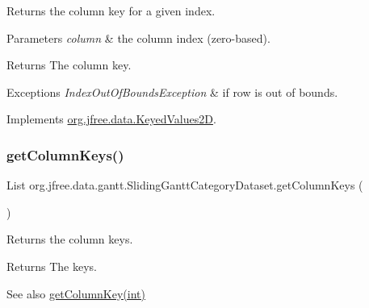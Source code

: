 Returns the column key for a given index.


\begin{DoxyParams}{Parameters}
{\em column} & the column index (zero-\/based).\\
\hline
\end{DoxyParams}
\begin{DoxyReturn}{Returns}
The column key.
\end{DoxyReturn}

\begin{DoxyExceptions}{Exceptions}
{\em Index\+Out\+Of\+Bounds\+Exception} & if {\ttfamily row} is out of bounds. \\
\hline
\end{DoxyExceptions}


Implements \mbox{\hyperlink{interfaceorg_1_1jfree_1_1data_1_1_keyed_values2_d_a9ced6cbaf04f048db059e1ebf5184d2a}{org.\+jfree.\+data.\+Keyed\+Values2D}}.

\mbox{\label{classorg_1_1jfree_1_1data_1_1gantt_1_1_sliding_gantt_category_dataset_a5a6d9404ac2413409fe2c046a8c758df}} 
\subsubsection{\texorpdfstring{get\+Column\+Keys()}{getColumnKeys()}}
{\footnotesize\ttfamily List org.\+jfree.\+data.\+gantt.\+Sliding\+Gantt\+Category\+Dataset.\+get\+Column\+Keys (\begin{DoxyParamCaption}{ }\end{DoxyParamCaption})}

Returns the column keys.

\begin{DoxyReturn}{Returns}
The keys.
\end{DoxyReturn}
\begin{DoxySeeAlso}{See also}
\mbox{\hyperlink{classorg_1_1jfree_1_1data_1_1gantt_1_1_sliding_gantt_category_dataset_a1030967720c6585c3a46acf80872ce3c}{get\+Column\+Key(int)}} 
\end{DoxySeeAlso}


